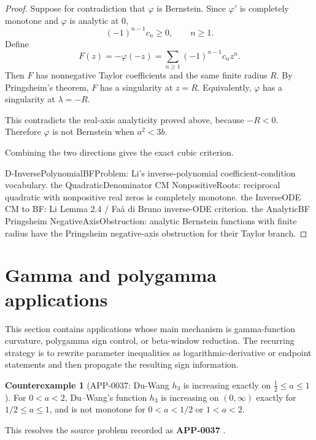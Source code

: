 \documentclass[11pt]{article}
\numberwithin{equation}{section}
\theoremstyle{definition}
\newtheorem{counterexample}[theorem]{Counterexample}
\theoremstyle{remark}
\newcommand{\1}{\mathbf 1}
\begin{document}
\begin{proof}
Suppose for contradiction that \(\varphi\) is Bernstein. Since \(\varphi'\) is completely monotone and \(\varphi\) is analytic at \(0\),
\[
(-1)^{n-1}c_n\ge0,\qquad n\ge1.
\]
Define
\[
F(z)=-\varphi(-z)=\sum_{n\ge1}(-1)^{n-1}c_n z^n.
\]
Then \(F\) has nonnegative Taylor coefficients and the same finite radius \(R\). By Pringsheim's theorem, \(F\) has a singularity at \(z=R\). Equivalently, \(\varphi\) has a singularity at \(\lambda=-R\).

This contradicts the real-axis analyticity proved above, because \(-R<0\). Therefore \(\varphi\) is not Bernstein when \(a^2<3b\).

Combining the two directions gives the exact cubic criterion.

D-InversePolynomialBFProblem: Li's inverse-polynomial coefficient-condition vocabulary.
the QuadraticDenominator CM NonpositiveRoots: reciprocal quadratic with nonpositive real zeros is completely monotone.
the InverseODE CM to BF: Li Lemma 2.4 / Faà di Bruno inverse-ODE criterion.
the AnalyticBF Pringsheim NegativeAxisObstruction: analytic Bernstein functions with finite radius have the Pringsheim negative-axis obstruction for their Taylor branch.
\end{proof}

\section{Gamma and polygamma applications}
\label{sec:gamma-and-polygamma-applications}



This section contains applications whose main mechanism is gamma-function curvature, polygamma sign control, or beta-window reduction.  The recurring strategy is to rewrite parameter inequalities as logarithmic-derivative or endpoint statements and then propagate the resulting sign information.

\begin{counterexample}[APP-0037: Du-Wang \(h_3\) is increasing exactly on \(\frac12\le a\le1\)]
\label{res:du-wang-h3-open-problem-2-classification}
For \(0<a<2\), Du--Wang's function \(h_3\) is increasing on \((0,\infty)\) exactly for \(1/2\le a\le1\), and is not monotone for \(0<a<1/2\) or \(1<a<2\).



This resolves the source problem recorded as \textbf{APP-0037} \cite{du-wang-h3}.
\end{counterexample}
\end{document}
